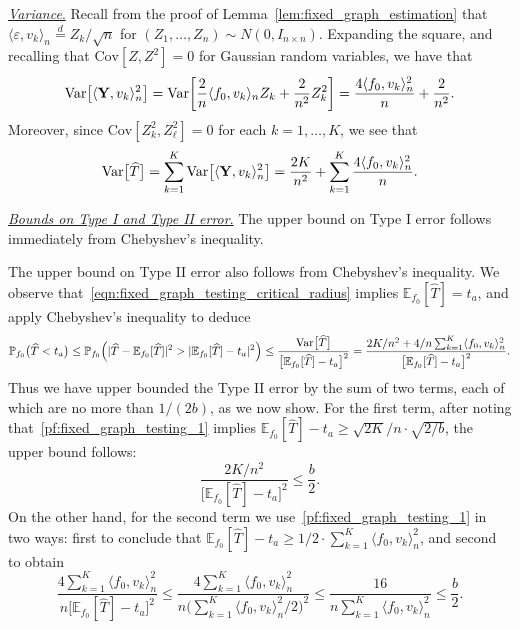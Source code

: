 \documentclass[aos]{imsart}
\theoremstyle{plain}
\theoremstyle{definition}
\theoremstyle{remark}
\newcommand{\Ebb}{\mathbb{E}}
\newcommand{\Pbb}{\mathbb{P}}
\newcommand{\dotp}[2]{\langle #1, #2 \rangle}
\newcommand{\wh}[1]{\widehat{#1}}
\newcommand{\Var}{\mathrm{Var}}
\newcommand{\Cov}{\mathrm{Cov}}
\newcommand{\1}{\mathbf{1}}
\begin{document}
\underline{\emph{Variance}.}
Recall from the proof of Lemma~\ref{lem:fixed_graph_estimation} that $\dotp{\varepsilon}{v_k}_n \overset{d}{=} Z_k/\sqrt{n}$ for $(Z_1,\ldots,Z_n) \sim N(0,I_{n \times n})$. Expanding the square, and recalling that $\Cov[Z,Z^2] = 0$ for Gaussian random variables, we have that
\begin{equation*}
\Var\bigl[\dotp{{\bf Y}}{v_k}_n^2\bigr] = \Var\biggl[\frac{2}{n}\dotp{f_0}{v_k}_nZ_k + \frac{2}{n^2}Z_k^2\biggr] = \frac{4\dotp{f_0}{v_k}_n^2}{n} + \frac{2}{n^2}.
\end{equation*}
Moreover, since $\Cov[Z_k^2,Z_{\ell}^2] = 0$ for each $k = 1,\ldots,K$, we see that
\begin{equation*}
\Var\bigl[\wh{T}\bigr] = \sum_{k = 1}^{K} \Var\bigl[\dotp{{\bf Y}}{v_k}_n^2\bigr] = \frac{2K}{n^2} + \sum_{k = 1}^{K}\frac{4\dotp{f_0}{v_k}_n^2}{n}.
\end{equation*}

\underline{\emph{Bounds on Type I and Type II error}.}
The upper bound on Type I error follows immediately from Chebyshev's inequality. 

The upper bound on Type II error also follows from Chebyshev's inequality. We observe that~\eqref{eqn:fixed_graph_testing_critical_radius} implies $\Ebb_{f_0}[\wh{T}] = t_a$, and apply Chebyshev's inequality to deduce
\begin{equation*}
\Pbb_{f_0}\bigl(\wh{T} < t_a\bigr) \leq \Pbb_{f_0}\Bigl(|\wh{T} - \Ebb_{f_0}[\wh{T}]|^2 > |\Ebb_{f_0}[\wh{T}] - t_a|^2\Bigr) \leq \frac{\Var\bigl[\wh{T}\bigr]}{\bigl[\Ebb_{f_0}[\wh{T}] - t_a\bigr]^2} = \frac{2K/n^2 + 4/n\sum_{k = 1}^{K}\dotp{f_0}{v_k}_n^2}{\bigl[\Ebb_{f_0}[\wh{T}] - t_a\bigr]^2}.
\end{equation*}
Thus we have upper bounded the Type II error by the sum of two terms, each of which are no more than $1/(2b)$, as we now show. For the first term, after noting that~\eqref{pf:fixed_graph_testing_1} implies $\Ebb_{f_0}[\wh{T}] - t_a \geq \sqrt{2K}/n \cdot \sqrt{2/b}$, the upper bound follows:
\begin{equation*}
\frac{2K/n^2}{\bigl[\Ebb_{f_0}[\wh{T}] - t_a\bigr]^2} \leq \frac{b}{2}.
\end{equation*}
On the other hand, for the second term we use~\eqref{pf:fixed_graph_testing_1} in two ways: first to conclude that $\Ebb_{f_0}[\wh{T}] - t_a \geq 1/2 \cdot \sum_{k = 1}^{K}\dotp{f_0}{v_k}_n^2$, and second to obtain
\begin{equation*}
\frac{4\sum_{k = 1}^{K}\dotp{f_0}{v_k}_n^2}{n\bigl[\Ebb_{f_0}[\wh{T}] - t_a\bigr]^2} \leq \frac{4\sum_{k = 1}^{K}\dotp{f_0}{v_k}_n^2}{n\bigl(\sum_{k = 1}^{K}\dotp{f_0}{v_k}_n^2/2\bigr)^2} \leq \frac{16}{n\sum_{k = 1}^{K}\dotp{f_0}{v_k}_n^2} \leq \frac{b}{2}.
\end{equation*}
\end{document}
